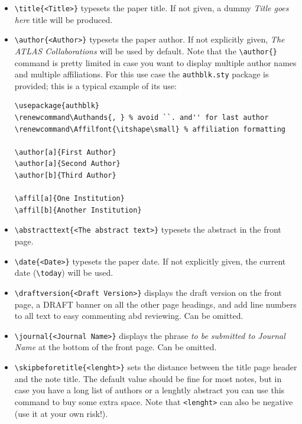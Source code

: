 \documentclass[11pt,a4paper]{../atlasnote}
\begin{document}
\begin{itemize}

  \item {\verb|\title{<Title>}|} typesets the paper title. If not
    given, a dummy \emph{Title goes here} title will be produced.

  \item {\verb|\author{<Author>}|} typesets the paper author. If not
    explicitly given, \emph{The ATLAS Collaborations} will be used by
    default. Note that the \verb|\author{}| command is pretty limited
    in case you want to display multiple author names and multiple
    affiliations. For this use case the \verb|authblk.sty| package is
    provided; this is a typical example of its use:
    \begin{verbatim}
\usepackage{authblk}
\renewcommand\Authands{, } % avoid ``. and'' for last author
\renewcommand\Affilfont{\itshape\small} % affiliation formatting

\author[a]{First Author}
\author[a]{Second Author}
\author[b]{Third Author}

\affil[a]{One Institution}
\affil[b]{Another Institution}
    \end{verbatim}

  \item {\verb|\abstracttext{<The abstract text>}|} typesets the
    abstract in the front page.

  \item {\verb|\date{<Date>}|} typesets the paper date. If not
    explicitly given, the current date (\verb|\today|) will be used.

  \item {\verb|\draftversion{<Draft Version>}|} displays the draft
    version on the front page, a DRAFT banner on all the other page
    headings, and add line numbers to all text to easy commenting abd
    reviewing. Can be omitted.

  \item {\verb|\journal{<Journal Name>}|} displays the phrase \emph{to
    be submitted to Journal Name} at the bottom of the front page. Can
    be omitted.

  \item {\verb|\skipbeforetitle{<lenght>}|} sets the distance between
    the title page header and the note title. The default value should
    be fine for most notes, but in case you have a long list of
    authors or a lenghtly abstract you can use this command to buy
    some extra space. Note that \verb|<lenght>| can also be negative
    (use it at your own risk!).

\end{itemize}
\end{document}
